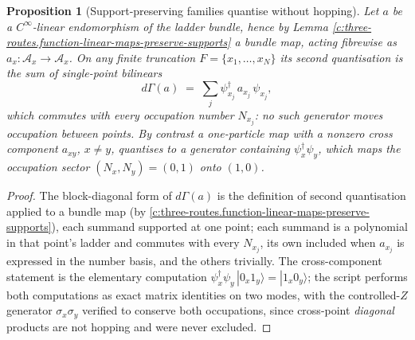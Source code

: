 \documentclass[11pt]{article}
\newtheorem{proposition}[theorem]{Proposition}
\theoremstyle{definition}
\theoremstyle{plain}
\providecommand{\Aa}{}\renewcommand{\Aa}{\mathcal{A}}
\begin{document}
\begin{proposition}[Support-preserving families quantise without hopping]\label{c:three-routes.support-preserving-families-quantise-without-hopping}
Let $a$ be a $C^\infty$-linear endomorphism of the ladder bundle, hence by Lemma \ref{c:three-routes.function-linear-maps-preserve-supports} a bundle map, acting fibrewise as $a_x : \Aa_x \to \Aa_x$. On any finite truncation $F = \{x_1, \dots, x_N\}$ its second quantisation is the sum of single-point bilinears
\[
d\Gamma(a) \;=\; \sum_{j} \psi^{\dagger}_{x_j}\, a_{x_j}\, \psi_{x_j},
\]
which commutes with every occupation number $N_{x_j}$: no such generator moves occupation between points. By contrast a one-particle map with a nonzero cross component $a_{x y}$, $x \neq y$, quantises to a generator containing $\psi^{\dagger}_x \psi_y$, which maps the occupation sector $(N_x, N_y) = (0,1)$ onto $(1,0)$.
\end{proposition}
\begin{proof}
The block-diagonal form of $d\Gamma(a)$ is the definition of second quantisation applied to a bundle map (by \ref{c:three-routes.function-linear-maps-preserve-supports}), each summand supported at one point; each summand is a polynomial in that point's ladder and commutes with every $N_{x_j}$, its own included when $a_{x_j}$ is expressed in the number basis, and the others trivially. The cross-component statement is the elementary computation $\psi^{\dagger}_x\psi_y\,|0_x 1_y\rangle = |1_x 0_y\rangle$; the script performs both computations as exact matrix identities on two modes, with the controlled-$Z$ generator $\sigma_x\sigma_y$ verified to conserve both occupations, since cross-point \emph{diagonal} products are not hopping and were never excluded.

\end{proof}
\end{document}
